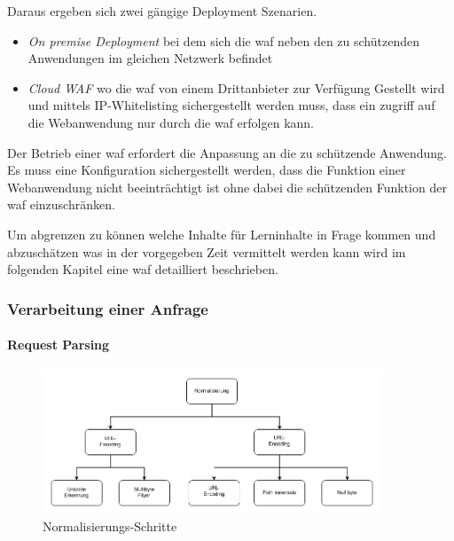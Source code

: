 Daraus ergeben sich zwei gängige Deployment Szenarien.

\begin{itemize}
     \item \textit{On premise Deployment} bei dem sich die \ac{waf} neben den zu schützenden Anwendungen im gleichen Netzwerk befindet
     \item \textit{Cloud WAF} wo die \ac{waf} von einem Drittanbieter zur Verfügung Gestellt wird und mittels IP-Whitelisting sichergestellt werden muss, dass ein zugriff auf die Webanwendung nur durch die \ac{waf} erfolgen kann.
\end{itemize}
Der Betrieb einer \ac{waf} erfordert die Anpassung an die zu schützende Anwendung. Es muss eine Konfiguration sichergestellt werden, dass die Funktion einer Webanwendung nicht beeinträchtigt ist ohne dabei die schützenden Funktion der \ac{waf} einzuschränken.

Um abgrenzen zu können welche Inhalte für Lerninhalte in Frage kommen und abzuschätzen was in der vorgegeben Zeit vermittelt werden kann wird im folgenden Kapitel eine \ac{waf} detailliert beschrieben.

\subsubsection{Verarbeitung einer Anfrage}
\paragraph{Request Parsing}

\begin{figure}[!hbt]
    \centering
    \includegraphics[width=0.9\textwidth]{./images/Normalisierung.png}
    \caption{Normalisierungs-Schritte}
    \label{fig:norming}
\end{figure}



